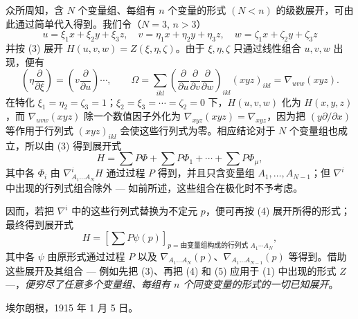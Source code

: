 众所周知，含 $N$ 个变量组、每组有 $n$ 个变量的形式 $(N<n)$ 的级数展开，可由此通过简单代入得到。我们令（$N=3$, $n>3$）
\[
  u=\xi_1x+\xi_2y+\xi_3z,
  \quad v=\eta_1x+\eta_2y+\eta_3z,
  \quad w=\zeta_1x+\zeta_2y+\zeta_3z
\]
并按 (3) 展开 $H(u,v,w)=Z(\xi,\eta,\zeta)$。由于 $\xi,\eta,\zeta$ 只通过线性组合 $u,v,w$ 出现，便有
\[
  \left(\eta\frac{\partial}{\partial \xi}\right)=
  \left(v\frac{\partial}{\partial u}\right)\cdots,
  \qquad
  \Omega=\sum_{ikl}\left(\frac{\partial}{\partial u}
  \frac{\partial}{\partial v}
  \frac{\partial}{\partial w}\right)_{ikl}(xyz)_{ikl}
  =\nabla_{uvw}(xyz).
\]
在特化 $\xi_1=\eta_2=\zeta_3=1$；$\xi_2=\xi_3=\cdots=\zeta_2=0$ 下，$H(u,v,w)$ 化为 $H(x,y,z)$，而 $\nabla_{uvw}(xyz)$ 除一个数值因子外化为 $\nabla_{xyz}(xyz)=\nabla_{xyz}$，因为把 $(y\partial/\partial x)$ 等作用于行列式 $(xyz)_{ikl}$ 会使这些行列式为零。相应结论对于 $N$ 个变量组也成立，所以由 (3) 得到展开式
\begin{equation}
  H=\sum P\Phi+\sum P\Phi_1+\cdots+\sum P\Phi_\mu,
\tag{4}
\end{equation}
其中各 $\Phi_i$ 由 $\nabla^i_{A_1\ldots A_N}H$ 通过过程 $P$ 得到，并且只含变量组 $A_1,
\ldots,A_{N-1}$；但 $\nabla^i$ 中出现的行列式组合除外 --- 如前所述，这些组合在极化时不予考虑。

因而，若把 $\nabla^i$ 中的这些行列式替换为不定元 $p$，便可再按 (4) 展开所得的形式；最终得到展开式
\begin{equation}
  H=\left[\sum P\psi(p)\right]_{p=\text{由变量组构成的行列式 }A_1\cdots A_N},
\tag{5}
\end{equation}
其中各 $\psi$ 由原形式通过过程 $P$ 以及 $\nabla_{A_1\ldots A_N}(p)$、$\nabla_{A_1\ldots A_{N-1}}(p)$ 等得到。借助这些展开及其组合 --- 例如先把 (3)、再把 (4) 和 (5) 应用于 (1) 中出现的形式 $Z$ ---，\emph{便穷尽了任意多个变量组、每组有 $n$ 个同变变量的形式的一切已知展开}。

埃尔朗根，1915 年 1 月 5 日。
